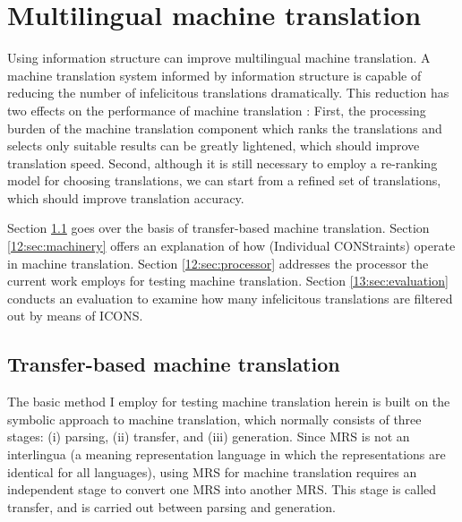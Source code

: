 \chapter{Multilingual machine translation}
\label{chapter12}
\setcounter{enums}{0}


\noindent Using information structure can improve multilingual machine
translation.  A machine translation system informed by information
structure is capable of reducing the number of infelicitous
translations dramatically. This reduction has two effects on the
performance of  machine translation
\citep{song:bender:11}: First, the processing burden of the machine
translation component which ranks the translations and selects only
suitable results can be greatly lightened, which should improve
translation speed.  Second, although it is still necessary to employ a
re-ranking model for choosing translations, we can start from a
refined set of translations, which should improve translation
accuracy.


Section \ref{2:sec:tmt} goes over the basis of transfer-based machine
translation.  Section \ref{12:sec:machinery} offers an explanation of
how  (Individual CONStraints)
operate in  machine translation. Section
\ref{12:sec:processor} addresses the processor the current work
employs for testing machine translation. Section
\ref{13:sec:evaluation} conducts an evaluation to examine how many
infelicitous translations are filtered out by means of ICONS.



\section{Transfer-based machine translation}
\label{2:sec:tmt}


The basic method I employ for testing machine translation herein is
built on the symbolic approach to machine translation, which normally
consists of three stages: (i)
parsing, (ii) transfer, and (iii) generation.  Since MRS is not an
interlingua (a meaning representation language in which the
representations are identical for all languages), using MRS for
machine translation requires an independent stage to convert one MRS
into another MRS. This stage is called transfer, and is carried out
between parsing and generation.  




